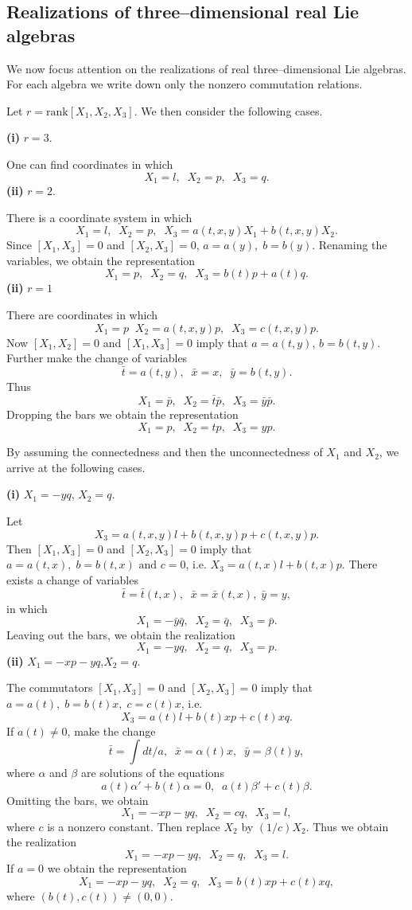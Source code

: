 \subsection{Realizations of three--dimensional real Lie algebras} 

We now focus attention on the realizations of real three--dimensional Lie
algebras. For each algebra we write down only the nonzero commutation
relations.
 
 
Let $r=\mbox{rank}[X_1,X_2,X_3]$. We then consider the following cases.

{\bf (i)} $r=3$.

One can find coordinates in which
\[X_1=l,\;\;X_2=p,\;\;X_3=q.\]
{\bf (ii)} $r=2$.

There is a coordinate
system in which \[X_1=l,\;\; X_2=p,\;\; X_3=a(t,x,y)X_1+b(t,x,y)X_2.\]
Since $[X_1,X_3]=0$ and $[X_2,X_3]=0$, $a=a(y),\;b=b(y)$. Renaming the
variables, we obtain the representation
\[X_1=p,\;\;X_2=q,\;\;X_3=b(t)p+a(t)q.\]
{\bf (ii)} $r=1$

There are
coordinates in which \[X_1=p\;\; X_2=a(t,x,y)p,\;\;X_3=c(t,x,y)p.\]
Now $[X_1,X_2]=0$ and $[X_1,X_3]=0$ imply that $a=a(t,y)$, $b=b(t,y)$. Further
make the change of variables \[\bar t=a(t,y),\;\;\bar x=x,\;\; \bar
y=b(t,y).\] Thus \[X_1=\bar p,\;\;X_2=\bar t \bar p,\;\;X_3=\bar y \bar
p.\] Dropping the bars we obtain the representation
\[X_1=p,\;\;X_2=tp,\;\;X_3=yp.\]

By assuming the connectedness and then the unconnectedness of $X_1$ and
$X_2$, we arrive at the following cases.

{\bf(i)} $X_1=-yq$, $X_2=q.$

Let \[X_3=a(t,x,y)l+b(t,x,y)p+c(t,x,y)p.\] Then $[X_1,X_3]=0$ and $[X_2,X_3]=0$
imply that $a=a(t,x),\;b=b(t,x)\mbox{ and } c=0$, i.e.
$X_3=a(t,x)l+b(t,x)p$. There exists a change of variables \[\bar t=\bar t
(t,x),\;\;\bar x=\bar x (t,x),\; \bar y=y, \] in which \[X_1=-\bar y \bar
q,\;\; X_2=\bar q,\;\;X_3=\bar p.\] Leaving out the bars, we obtain the
realization \[X_1=-yq,\;\;X_2=q,\;\;X_3=p.\]
{\bf (ii)} $X_1=-xp-yq$,$X_2=q.$

The commutators $[X_1,X_3]=0$ and $[X_2,X_3]=0$ imply that
$a=a(t),\;b=b(t)x,\;c=c(t)x$, i.e.
\[X_3=a(t)l+b(t)xp+c(t)xq.\]
If $a(t)\ne
0$, make the change \[\bar t=\int dt/a ,\;\;\bar x= \alpha
(t)x,\;\;\bar y= \beta (t)y,\] where $\alpha$ and $\beta$ are solutions of
the equations \[a(t)\alpha '+b(t)\alpha=0,\;\;a(t)\beta '+c(t)\beta.\]
Omitting the bars, we obtain \[X_1=-xp-yq,\;\;X_2=cq,\;\;X_3=l,\] where
$c$ is a nonzero constant. Then replace $X_2$ by $(1/c) X_2$. Thus we
obtain the realization \[X_1=-xp-yq,\;\;X_2=q,\;\;X_3=l.\] If $a=0$ we
obtain the representation \[X_1=-xp-yq,\;\;X_2=q,\;\; X_3=b(t)xp+c(t)xq,\]
where $ (b(t),c(t))\ne (0,0).$

